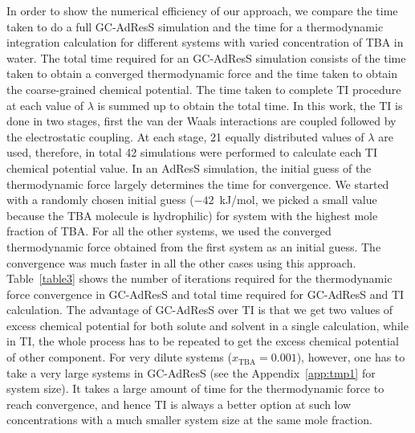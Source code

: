 \documentclass[a4paper,preprint,unsortedaddress]{revtex4-1}
\newcommand{\concenttba}{x_{\textrm{TBA}}}
\begin{document}
{In order to show the numerical efficiency of our approach, we compare the time taken to do a full GC-AdResS simulation and the time for a thermodynamic integration calculation for
different systems with varied concentration of TBA in water. The total time required for an GC-AdResS simulation consists of 
the time taken to obtain a converged thermodynamic force and the time taken to obtain the coarse-grained chemical potential. 
The time taken to complete TI procedure at each value of $\lambda$ is summed up to obtain the total time. In this work, the TI 
is done in two stages, first the van der Waals  interactions are coupled followed by the electrostatic coupling. At each stage, 21 
equally distributed values of $\lambda$ are used,
therefore, in total 42 simulations were performed to calculate each TI chemical potential value.
In an AdResS simulation, the initial guess of the thermodynamic force largely determines the time for convergence. 
We started with a randomly chosen initial guess
($-42$~kJ/mol, we picked a small value because the TBA molecule is hydrophilic)
for system with the highest mole fraction of TBA. For all the other systems, 
we used the converged thermodynamic force obtained from the first system as an initial guess. The convergence was much 
faster in all the other cases using this approach. Table~\ref{table3} shows the number of iterations required for 
the thermodynamic force convergence in GC-AdResS and total time required for GC-AdResS and TI calculation.
The advantage of GC-AdResS over TI
is that we get two values of excess chemical potential for both solute and solvent in a single calculation, while 
in TI, the whole process has to be repeated to get the excess chemical potential of other component. For very dilute systems ($\concenttba=0.001$), 
however, one has to take a very large systems in GC-AdResS (see the Appendix~\ref{app:tmp1} for system size). It takes a large amount of time for the thermodynamic force to reach convergence, and hence TI is always a better option at such low concentrations with a much 
smaller system size at the same mole fraction. 

}
\end{document}
